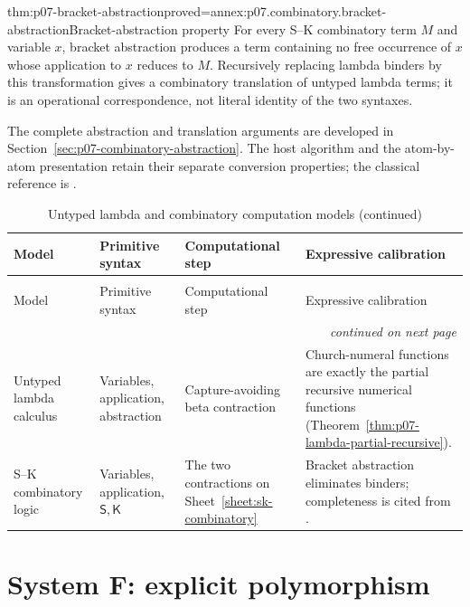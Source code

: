 \begin{hbtheorem}{thm:p07-bracket-abstraction}{proved=annex:p07.combinatory.bracket-abstraction}{Bracket-abstraction property}
For every S--K combinatory term \(M\) and variable \(x\), bracket abstraction
produces a term containing no free occurrence of \(x\) whose application to
\(x\) reduces to \(M\).  Recursively replacing lambda binders by this
transformation gives a combinatory translation of untyped lambda terms; it is
an operational correspondence, not literal identity of the two syntaxes.
\end{hbtheorem}

The complete abstraction and translation arguments are developed in
Section~\ref{sec:p07-combinatory-abstraction}. The host algorithm and
the atom-by-atom presentation \cite{Selinger2013LambdaNotesV2} retain their
separate conversion properties; the classical reference is \cite{CurryFeys1958}.



\begingroup\small
\begin{longtable}{@{}p{}p{}p{}p{}@{}}
\caption{Untyped lambda and combinatory computation models.}
\label{tab:p07-untyped-computation-models}\\
\toprule
Model & Primitive syntax & Computational step & Expressive calibration \\
\midrule
\endfirsthead
\caption[]{Untyped lambda and combinatory computation models (continued)}\\
\toprule
Model & Primitive syntax & Computational step & Expressive calibration \\
\midrule
\endhead
\midrule\multicolumn{4}{r}{\emph{continued on next page}}\\
\endfoot
\endlastfoot
Untyped lambda calculus & Variables, application, abstraction &
Capture-avoiding beta contraction & Church-numeral functions are exactly the
partial recursive numerical functions
(Theorem~\ref{thm:p07-lambda-partial-recursive}). \\
S--K combinatory logic & Variables, application, \(\mathsf S,\mathsf K\) &
The two contractions on Sheet~\ref{sheet:sk-combinatory} & Bracket
abstraction eliminates binders; completeness is cited from
\cite{CurryFeys1958}. \\
\bottomrule
\end{longtable}
\endgroup

\section{System F: explicit polymorphism}

